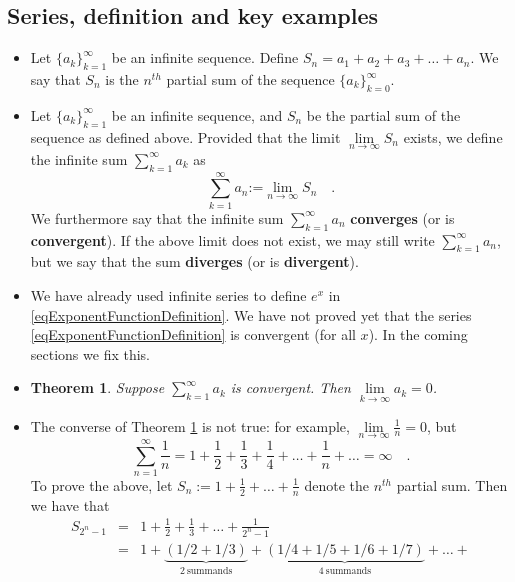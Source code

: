 \documentclass[12pt]{book}
\newcommand{\eqdef}{\textbf{:=}}
\newcommand{\importantFormula}[1]{\begin{equation} \boxed{#1} \end{equation}}
\newtheorem{theorem}{Theorem}[section]
\renewcommand{\emph}{\textbf}
\begin{document}
\subsection{Series, definition and key examples}
\begin{itemize}
\item Let $\{a_k\}_{k=1}^\infty$ be an infinite sequence. Define $S_n= a_1+a_2+a_3+\dots+a_n$. We say that $S_n$ is the $n^{th}$ partial sum of the sequence $\{a_k\}_{k=0}^\infty$.
\item  Let $\{a_k\}_{k=1}^\infty$ be an infinite sequence, and $S_n$ be the partial sum of the sequence as defined above. Provided that the limit $\lim\limits_{n\to\infty} S_n$ exists, we define the infinite sum $\sum\limits_{k=1}^\infty a_k $ as
\importantFormula{
\sum_{k=1}^{\infty}a_n\eqdef \lim\limits_{n\to \infty} S_n\quad .
}
We furthermore say that the infinite sum $\sum\limits_{k=1}^{\infty}a_n$ \emph{converges} (or is \emph{convergent}). If the above limit does not exist, we may still write $\sum\limits_{k=1}^{\infty}a_n$, but we say that the sum \emph{diverges} (or is \emph{divergent}).  
\item We have already used infinite series to define $e^x$ in \eqref{eqExponentFunctionDefinition}. We have not proved yet that the series \eqref{eqExponentFunctionDefinition} is convergent (for all $x$). In the coming sections we fix this.
\item 
\begin{theorem}\label{thSummandsConvergentSeriesTendToZero}
Suppose $\sum\limits_{k=1}^\infty a_k$ is convergent. Then $\lim\limits_{k\to \infty } a_k=0$.
\end{theorem}
\item The converse of Theorem \ref{thSummandsConvergentSeriesTendToZero} is not true: for example, $\lim\limits_{n\to \infty} \frac{1}{n}=0$, but 
\begin{equation}\label{eqHarmonicSeries}
\sum_{n=1}^{\infty}\frac{1}n= 1+\frac{1}2+\frac13+\frac14+\dots +\frac1n+\dots=\infty\quad .
\end{equation}
To prove the above, let $S_n:=1+\frac{1}2+\dots +\frac{1}n$ denote the $n^{th}$ partial sum. Then we have that
\begin{equation*}
\begin{array}{rcl}
S_{2^n-1}&=&1+\frac{1}2+\frac13 +\dots +\frac{1}{2^n-1}\\
&=& 1+ \underbrace{\left(1/2+1/3\right)}_{\mathrm{2~summands}} +\underbrace{(1/4+1/5+1/6+1/7)}_{\mathrm{4~summands}}+\dots +

\end{array}
\end{equation*}
\end{itemize}
\end{document}
